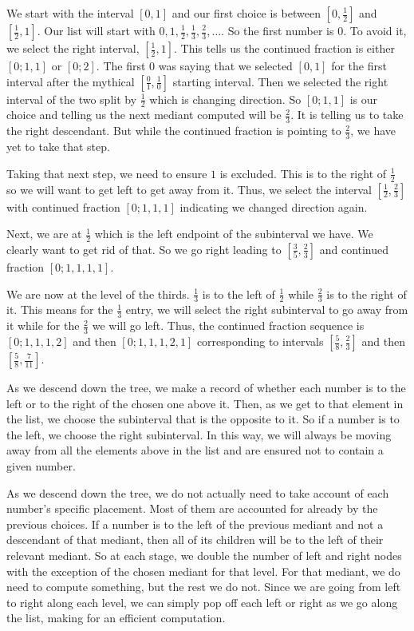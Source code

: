 \documentclass[12pt]{article}
\theoremstyle{remark}
\begin{document}
We start with the interval $[0,1]$ and our first choice is between $[0,\frac{1}{2}]$ and $[\frac{1}{2}, 1]$. Our list will start with $0, 1, \frac{1}{2}, \frac{1}{3}, \frac{2}{3}, \ldots$. So the first number is $0$. To avoid it, we select the right interval, $[\frac{1}{2}, 1]$. This tells us the continued fraction is either $[0;1,1]$ or $[0;2]$. The first $0$ was saying that we selected $[0,1]$ for the first interval after the mythical $[\frac{0}{1}, \frac{1}{0}]$ starting interval. Then we selected the right interval of the two split by $\frac{1}{2}$ which is changing direction. So $[0;1,1]$ is our choice and telling us the next mediant computed will be $\frac{2}{3}$. It is telling us to take the right descendant. But while the continued fraction is pointing to $\frac{2}{3}$, we have yet to take that step. 

Taking that next step, we need to ensure $1$ is excluded. This is to the right of $\frac{1}{2}$ so we will want to get left to get away from it. Thus, we select the interval $[\frac{1}{2}, \frac{2}{3}]$ with continued fraction $[0;1,1,1]$ indicating we changed direction again. 

Next, we are at $\frac{1}{2}$ which is the left endpoint of the subinterval we have. We clearly want to get rid of that. So we go right leading to $[\frac{3}{5}, \frac{2}{3}]$ and continued fraction $[0; 1, 1, 1, 1]$. 

We are now at the level of the thirds. $\frac{1}{3}$ is to the left of $\frac{1}{2}$ while $\frac{2}{3}$ is to the right of it. This means for the $\frac{1}{3}$ entry, we will select the right subinterval to go away from it while for the $\frac{2}{3}$ we will go left. Thus, the continued fraction sequence is $[0;1, 1, 1, 2]$ and then $[0; 1, 1, 1, 2, 1]$ corresponding to intervals $[\frac{5}{8}, \frac{2}{3}]$ and then $[\frac{5}{8}, \frac{7}{11}]$. 

As we descend down the tree, we make a record of whether each number is to the left or to the right of the chosen one above it. Then, as we get to that element in the list, we choose the subinterval that is the opposite to it. So if a number is to the left, we choose the right subinterval. In this way, we will always be moving away from all the elements above in the list and are ensured not to contain a given number. 

As we descend down the tree, we do not actually need to take account of each number's specific placement. Most of them are accounted for already by the previous choices. If a number is to the left of the previous mediant and not a descendant of that mediant, then all of its children will be to the left of their relevant mediant. So at each stage, we double the number of left and right nodes with the exception of the chosen mediant for that level. For that mediant, we do need to compute something, but the rest we do not. Since we are going from left to right along each level, we can simply pop off each left or right as we go along the list, making for an efficient computation. 
\end{document}
